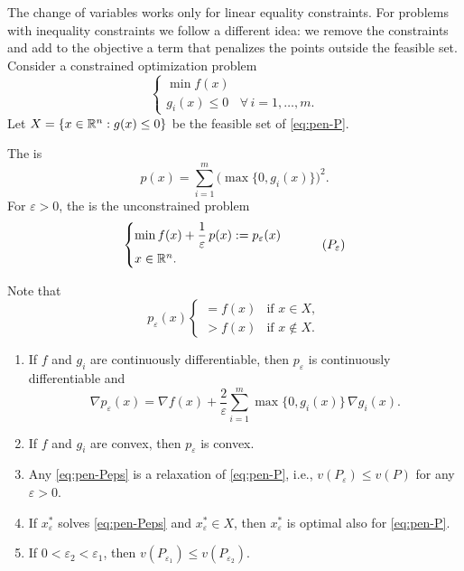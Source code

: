 The change of variables works only for linear equality constraints. For problems with inequality constraints we follow a different idea: we remove the constraints and add to the objective a term that penalizes the points outside the feasible set. Consider a constrained optimization problem
\begin{equation}\label{eq:pen-P}
\begin{cases}
\min f(x)\\
g_i(x) \le 0 & \forall\, i=1,\dots,m.
\end{cases}
\tag{P}
\end{equation}
Let $X = \{x \in \mathbb{R}^n : g(x) \le 0\}$ be the feasible set of \eqref{eq:pen-P}.

\begin{definition}
The  is
\[
p(x) = \sum_{i=1}^{m} \big(\max\{0, g_i(x)\}\big)^2.
\]
For $\varepsilon > 0$, the  is the unconstrained problem
\begin{equation}\label{eq:pen-Peps}
\begin{cases}
\displaystyle \min f(x) + \frac{1}{\varepsilon}\, p(x) := p_\varepsilon(x)\\[1ex]
x \in \mathbb{R}^n.
\end{cases}
\tag{$P_\varepsilon$}
\end{equation}
\end{definition}

Note that
\[
p_\varepsilon(x)
\begin{cases}
= f(x) & \text{if } x \in X,\\
> f(x) & \text{if } x \notin X.
\end{cases}
\]

\begin{proposition}\label{prop:penalty}
\leavevmode
\begin{enumerate}
    \item If $f$ and $g_i$ are continuously differentiable, then $p_\varepsilon$ is continuously differentiable and
    \[
    \nabla p_\varepsilon(x) = \nabla f(x) + \frac{2}{\varepsilon}\sum_{i=1}^{m} \max\{0, g_i(x)\}\, \nabla g_i(x).
    \]
    \item If $f$ and $g_i$ are convex, then $p_\varepsilon$ is convex.
    \item Any \eqref{eq:pen-Peps} is a relaxation of \eqref{eq:pen-P}, i.e., $v(P_\varepsilon) \le v(P)$ for any $\varepsilon > 0$.
    \item If $x_\varepsilon^*$ solves \eqref{eq:pen-Peps} and $x_\varepsilon^* \in X$, then $x_\varepsilon^*$ is optimal also for \eqref{eq:pen-P}.
    \item If $0 < \varepsilon_2 < \varepsilon_1$, then $v(P_{\varepsilon_1}) \le v(P_{\varepsilon_2})$.
\end{enumerate}
\end{proposition}

